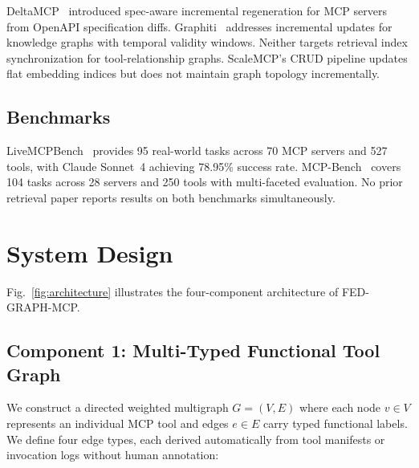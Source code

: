\documentclass[conference]{IEEEtran}
\begin{document}
DeltaMCP~\cite{deltamcp2026} introduced spec-aware incremental
regeneration for MCP servers from OpenAPI specification diffs.
Graphiti~\cite{graphiti2024} addresses incremental updates for
knowledge graphs with temporal validity windows. Neither targets
retrieval index synchronization for tool-relationship graphs.
ScaleMCP's CRUD pipeline updates flat embedding indices but does not
maintain graph topology incrementally.

\subsection{Benchmarks}

LiveMCPBench~\cite{mo2025livemcpbench} provides 95 real-world tasks
across 70 MCP servers and 527 tools, with Claude Sonnet~4 achieving
78.95\% success rate. MCP-Bench~\cite{wang2025mcpbench} covers 104
tasks across 28 servers and 250 tools with multi-faceted evaluation.
No prior retrieval paper reports results on both benchmarks
simultaneously.


\section{System Design}

Fig.~\ref{fig:architecture} illustrates the four-component
architecture of FED-GRAPH-MCP.

\subsection{Component 1: Multi-Typed Functional Tool Graph}

We construct a directed weighted multigraph $G = (V, E)$ where each
node $v \in V$ represents an individual MCP tool and edges $e \in E$
carry typed functional labels. We define four edge types, each
derived automatically from tool manifests or invocation logs without
human annotation:
\end{document}
